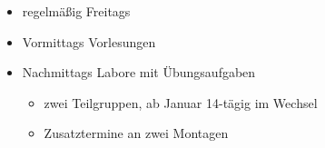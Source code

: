 \begin{frame}
    \begin{itemize}
        \item regelmäßig Freitags
        \item Vormittags Vorlesungen
        \item Nachmittags Labore mit Übungsaufgaben
        \begin{itemize}
            \item zwei Teilgruppen, ab Januar 14-tägig im Wechsel
            \item Zusatztermine an zwei Montagen
        \end{itemize}
    \end{itemize}
\end{frame}